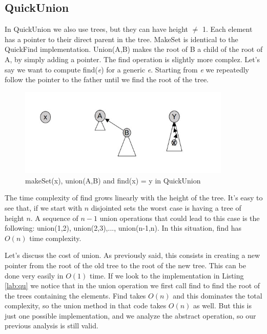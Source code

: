 \documentclass{article}
\begin{document}
\subsection{QuickUnion} \label{QU}
In QuickUnion we also use trees, but they can have height $\neq$ 1. Each element has a pointer to their
direct parent in the tree. MakeSet is identical to the QuickFind implementation. Union(A,B) makes the root of B a child of the 
root of A, by simply adding a pointer. The find operation is slightly more complez. Let's say
we want to compute find(\emph{e}) for a generic \emph{e}. Starting from \emph{e} we repeatedly 
follow the pointer to the father until we find the root of the tree.
\begin{figure}[h!]
    \centering
    \includegraphics[width=0.9\textwidth]  {img/uf.jpg}
    \caption{makeSet(x), union(A,B) and find(x) = y in QuickUnion}
    \label{fig:quickUnion}
\end{figure}
\newpage
The time complexity of find grows linearly with the height of the tree. It's easy to see
that, if we start with $n$ disjointed sets the worst case is having a tree of height $n$. A sequence
of $n-1$ union operations that could lead to this case is the following: union(1,2), union(2,3),..., union(n-1,n).
In this situation, find has $O(n)$ time complexity. 
\begin{center}
     
\end{center}
Let's discuss the cost of union. As previously said,
this consists in creating a new pointer from the root of the old tree to the root of the new tree. This can be done 
very easily in $O(1)$ time. If we look to the implementation in Listing \ref{lab:qu} we notice
that in the union operation we first call find to find the root of the trees containing the elements. Find takes $O(n)$ and this dominates the 
total complexity, so the union method in that code takes $ O(n)$ as well. But this is just one possible implementation, and we analyze
the abstract operation, so our previous analysis is still valid. 
\end{document}
